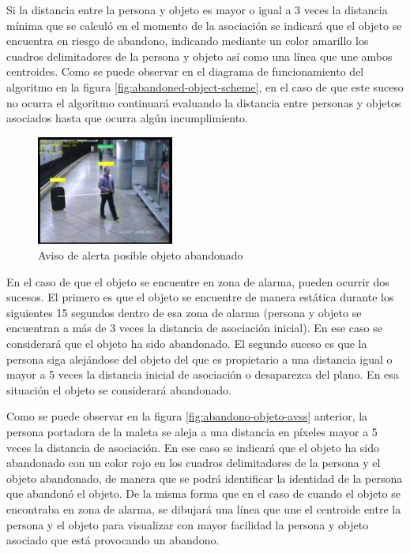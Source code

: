 Si la distancia entre la persona y objeto es mayor o igual a 3 veces la distancia mínima que se calculó en el momento de la asociación se indicará que el objeto se encuentra en riesgo de abandono, indicando mediante un color amarillo los cuadros delimitadores de la persona y objeto así como una línea que une ambos centroides. Como se puede observar en el diagrama de funcionamiento del algoritmo en la figura \ref{fig:abandoned-object-scheme}, en el caso de que este suceso no ocurra el algoritmo continuará evaluando la distancia entre personas y objetos asociados hasta que ocurra algún incumplimiento.

\begin{figure}[ht]
\centering
\includegraphics[width=0.4\textwidth]{img/chapters/desarrollo/warning-abandono.jpg}
\caption{\label{fig:warning-abandono}Aviso de alerta posible objeto abandonado \cite{AVSSAB2007-dataset}}
\end{figure}

En el caso de que el objeto se encuentre en zona de alarma, pueden ocurrir dos sucesos. El primero es que el objeto se encuentre de manera estática durante los siguientes 15 segundos dentro de esa zona de alarma (persona y objeto se encuentran a más de 3 veces la distancia de asociación inicial). En ese caso se considerará que el objeto ha sido abandonado. El segundo suceso es que la persona siga alejándose del objeto del que es propietario a una distancia igual o mayor a 5 veces la distancia inicial de asociación o desaparezca del plano. En esa situación el objeto se considerará abandonado.

Como se puede observar en la figura \ref{fig:abandono-objeto-avss} anterior, la persona portadora de la maleta se aleja a una distancia en píxeles mayor a 5 veces la distancia de asociación. En ese caso se indicará que el objeto ha sido abandonado con un color rojo en los cuadros delimitadores de la persona y el objeto abandonado, de manera que se podrá identificar la identidad de la persona que abandonó el objeto. De la misma forma que en el caso de cuando el objeto se encontraba en zona de alarma, se dibujará una línea que une el centroide entre la persona y el objeto para visualizar con mayor facilidad la persona y objeto asociado que está provocando un abandono.

